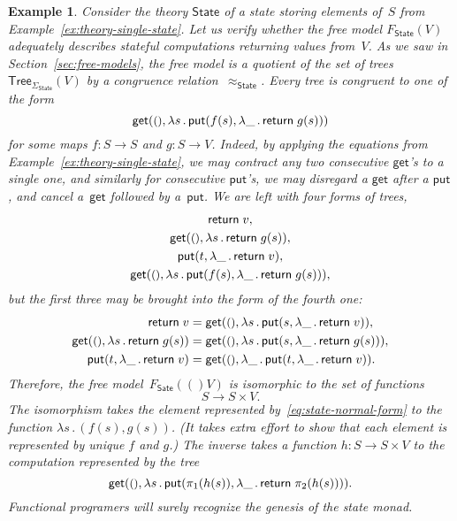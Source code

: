 \documentclass{amsart}
\newcommand{\theory}[1]{\mathsf{#1}} %
\newcommand{\signature}[1]{\Sigma_{\theory{#1}}} %
\newcommand{\Free}[2]{F_{\theory{#1}}(#2)} %
\newcommand{\lam}[1]{\lambda #1 \,.\,}
\newcommand{\Tree}[2]{\mathsf{Tree}_{#1}(#2)} %
\newcommand{\unit}{{\text{\small$()$}}} %
\newcommand{\kode}[1]{\mathsf{#1}}
\newcommand{\opcall}[3]{\kode{#1}(#2, #3)}
\newcommand{\return}[1]{\kode{return}\;#1}
\newtheorem{example}{Example}[section]
\begin{document}
\begin{example}
  Consider the theory $\theory{State}$ of a state storing elements of~$S$ from
  Example~\ref{ex:theory-single-state}. Let us verify whether the free model
  $\Free{State}{V}$ adequately describes stateful computations returning values
  from~$V$. As we saw in Section~\ref{sec:free-models}, the free model is a
  quotient of the set of trees $\Tree{\signature{State}}{V}$ by a congruence
  relation~$\approx_{\theory{State}}$. Every tree is congruent to one of the
  form
  \begin{equation}
    \label{eq:state-normal-form}
    \opcall{get}{\unit}{
      \lam{s} \opcall{put}{f(s)}{\lam{\_} \return{g(s)}}
    }
  \end{equation}
  for some maps $f : S \to S$ and $g : S \to V$. Indeed, by applying the
  equations from Example~\ref{ex:theory-single-state}, we may contract any two
  consecutive $\kode{get}$'s to a single one, and similarly for consecutive
  $\kode{put}$'s, we may disregard a $\kode{get}$ after a $\kode{put}$, and
  cancel a~$\kode{get}$ followed by a~$\kode{put}$. We are left with four
  forms of trees,
  \begin{gather*}
    \return{v},\\
    \opcall{get}{\unit}{\lam{s} \return{g(s)}},\\
    \opcall{put}{t}{\lam{\_} \return{v}},\\
    \opcall{get}{\unit}{
      \lam{s} \opcall{put}{f(s)}{\lam{\_} \return{g(s)}}
    },
  \end{gather*}
  but the first three may be brought into the form of the fourth one:
  \begin{align*}
    \return{v} &=
    \opcall{get}{\unit}{\lam{s} \opcall{put}{s}{\lam{\_} \return{v}}},
    \\
    \opcall{get}{\unit}{\lam{s} \return{g(s)}} &=
    \opcall{get}{\unit}{\lam{s} \opcall{put}{s}{\lam{\_} \return{g(s)}}},
    \\
    \opcall{put}{t}{\lam{\_} \return{v}} &=
    \opcall{get}{\unit}{\lam{\_} \opcall{put}{t}{\lam{\_} \return{v}}}.
  \end{align*}
  Therefore, the free model~$\Free{Sate}(V)$ is isomorphic to the set of
  functions
  \begin{equation*}
    S \to S \times V.
  \end{equation*}
  The isomorphism takes the element represented by~\eqref{eq:state-normal-form}
  to the function $\lam{s} (f(s), g(s))$. (It takes extra effort to show that
  each element is represented by unique $f$ and $g$.) The inverse takes a
  function $h : S \to S \times V$ to the computation represented by the tree
  \begin{equation*}
    \opcall{get}{\unit}{
      \lam{s} \opcall{put}{\pi_1(h(s))}{\lam{\_} \return{\pi_2(h(s))}}
    }.
  \end{equation*}
  Functional programers will surely recognize the genesis of the state monad.
\end{example}
\end{document}
